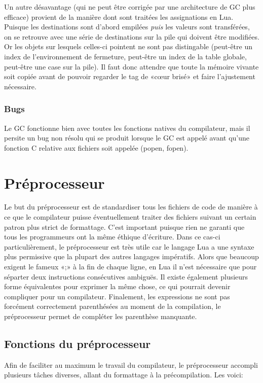 \documentclass{article}
\begin{document}
Un autre désavantage (qui ne peut être corrigée par une architecture de GC plus efficace) provient de la manière dont sont traitées les assignations en Lua. Puisque les destinations sont d'abord empilées \textit{puis} les valeurs sont transférées, on se retrouve avec une série de destinations sur la pile qui doivent être modifiées. Or les objets sur lesquels celles-ci pointent ne sont pas distingable (peut-être un index de l'environnement de fermeture, peut-être un index de la table globale, peut-être une case sur la pile). Il faut donc attendre que toute la mémoire vivante soit copiée avant de pouvoir regarder le tag de «c\oe{}ur brisé» et faire l'ajustement nécessaire.

\subsubsection{Bugs}
Le GC fonctionne bien avec toutes les fonctions natives du compilateur, mais il persite un bug non résolu qui se produit lorsque le GC est appelé avant qu'une fonction C relative aux fichiers soit appelée (popen, fopen).

\newpage
\section{Préprocesseur}
Le but du préprocesseur est de standardiser tous les fichiers de code de manière à ce que le compilateur puisse éventuellement traiter des fichiers suivant un certain patron plus strict de formattage. C'est important puisque rien ne garanti que tous les programmeurs ont la même éthique d'écriture. Dans ce cas-ci particulièrement, le préprocesseur est très utile car le langage Lua a une syntaxe plus permissive que la plupart des autres langages impératifs. Alors que beaucoup exigent le fameux «;» à la fin de chaque ligne, en Lua il n'est nécessaire que pour séparter deux instructions consécutives ambiguës. Il existe également plusieurs forme équivalentes pour exprimer la même chose, ce qui pourrait devenir compliquer pour un compilateur. Finalement, les expressions ne sont pas forcément correctement parenthésées au moment de la compilation, le préprocesseur permet de compléter les parenthèse manquante.

\subsection{Fonctions du préprocesseur}
Afin de faciliter au maximum le travail du compilateur, le préprocesseur accompli plusieurs tâches diverses, allant du formattage à la précompilation. Les voici:
\end{document}
